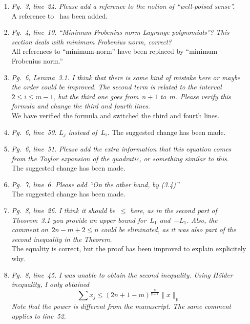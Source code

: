 \documentclass{article}
\begin{document}
\begin{enumerate}
    \item \textit{Pg.~3, line~24. Please add a reference to the notion of ``well-poised sense''.}\\
    A reference to~\cite[\S~3.3]{Conn_Scheinberg_Vicente_2009} has been added.
    \item \textit{Pg.~4, line~10. ``Minimum Frobenius norm Lagrange polynomials''? This section deals with minimum Frobenius norm, correct?}\\
    All references to ``minimum-norm'' have been replaced by ``minimum Frobenius norm.''
    \item \textit{Pg.~6, Lemma~3.1. I think that there is some kind of mistake here or maybe the order could be improved. The second term is related to the interval~$2 \le i \le m - 1$, but the third one goes from~$n + 1$ to~$m$. Please verify this formula and change the third and fourth lines.}\\
    We have verified the formula and switched the third and fourth lines.
    \item \textit{Pg.~6, line~50. $L_j$ instead of~$L_i$.}
    The suggested change has been made.
    \item \textit{Pg.~6, line~51. Please add the extra information that this equation comes from the Taylor expansion of the quadratic, or something similar to this.}\\
    The suggested change has been made.
    \item \textit{Pg.~7, line~6. Please add ``On the other hand, by (3.4)''}\\
    The suggested change has been made.
    \item \textit{Pg.~8, line~26. I think it should be~$\le$ here, as in the second part of Theorem~3.1 you provide an upper bound for~$L_1$ and~$-L_1$. Also, the comment on~$2n - m + 2 \le n$ could be eliminated, as it was also part of the second inequality in the Theorem.}\\
    The equality is correct, but the proof has been improved to explain explicitely why.
    \item \textit{Pg.~8, line~45. I was unable to obtain the second inequality. Using H{\"{o}}lder inequality, I only obtained}
    \begin{equation*}
        \sum x_j \le (2n + 1 - m)^{\frac{p}{p - 1}} \lVert x \rVert_p
    \end{equation*}
    \textit{Note that the power is different from the manuscript. The same comment applies to line~52.}\\

\end{enumerate}
\end{document}
